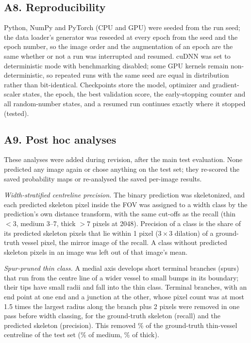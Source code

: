 \subsection*{A8. Reproducibility}
Python, NumPy and PyTorch (CPU and GPU) were seeded from the run seed; the data loader's generator was reseeded at every
epoch from the seed and the epoch number, so the image order and the augmentation of an epoch are the same whether or not
a run was interrupted and resumed. cuDNN was set to deterministic mode with benchmarking disabled; some GPU kernels remain
non-deterministic, so repeated runs with the same seed are equal in distribution rather than bit-identical. Checkpoints
store the model, optimizer and gradient-scaler states, the epoch, the best validation score, the early-stopping counter
and all random-number states, and a resumed run continues exactly where it stopped (tested).

\subsection*{A9. Post hoc analyses}
These analyses were added during revision, after the main test evaluation. None predicted any image again or chose
anything on the test set; they re-scored the saved probability maps or re-analysed the saved per-image results.

\textit{Width-stratified centreline precision.} The binary prediction was skeletonized, and each predicted skeleton pixel
inside the FOV was assigned to a width class by the prediction's own distance transform, with the same cut-offs as the
recall (thin $< 3$, medium 3--7, thick $> 7$ pixels at 2048). Precision of a class is the share of its predicted
skeleton pixels that lie within 1 pixel ($3 \times 3$ dilation) of a ground-truth vessel pixel, the mirror image of the
recall. A class without predicted skeleton pixels in an image was left out of that image's mean.

\textit{Spur-pruned thin class.} A medial axis develops short terminal branches (spurs) that run from the centre line of
a wider vessel to small bumps in its boundary; their tips have small radii and fall into the thin class. Terminal
branches, with an end point at one end and a junction at the other, whose pixel count was at most 1.5 times the largest
radius along the branch plus 2 pixels were removed in one pass before width classing, for the ground-truth skeleton
(recall) and the predicted skeleton (precision). This removed \PHPrunedThinShare\% of the ground-truth thin-vessel
centreline of the test set (\PHPrunedMedShare\% of medium, \PHPrunedThickShare\% of thick).

